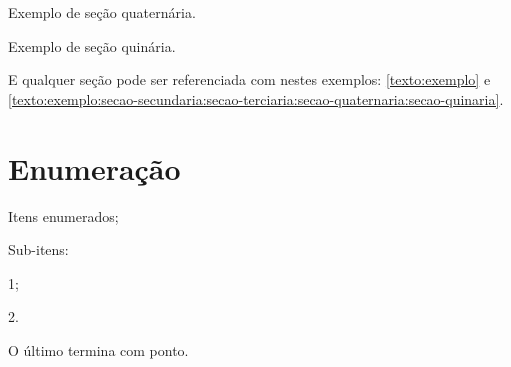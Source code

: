 Exemplo de seção quaternária.

\label{texto:exemplo:secao-secundaria:secao-terciaria:secao-quaternaria:secao-quinaria}

Exemplo de seção quinária.

E qualquer seção pode ser referenciada com nestes exemplos: \autoref{texto:exemplo} e \autoref{texto:exemplo:secao-secundaria:secao-terciaria:secao-quaternaria:secao-quinaria}.

\section{Enumeração}\label{texto:exemplo:enumeracao}

\begin{alineas}
    \item Itens enumerados;
    \item Sub-itens:
    \begin{alineas}
        \item 1;
        \item 2.
    \end{alineas}
    \item O último termina com ponto.
\end{alineas}
